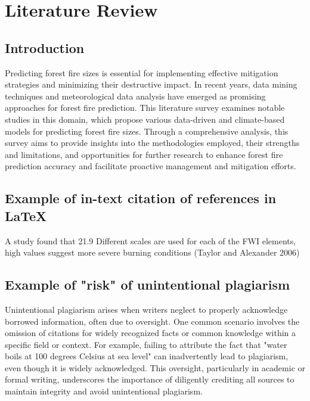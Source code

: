 \chapter{Literature Review}
\label{ch:lit_rev} %
\section{Introduction}
\label{sec:into_back}

Predicting forest fire sizes is essential for implementing effective mitigation strategies and minimizing their destructive impact. In recent years, data mining techniques and meteorological data analysis have emerged as promising approaches for forest fire prediction. This literature survey examines notable studies in this domain, which propose various data-driven and climate-based models for predicting forest fire sizes. Through a comprehensive analysis, this survey aims to provide insights into the methodologies employed, their strengths and limitations, and opportunities for further research to enhance forest fire prediction accuracy and facilitate proactive management and mitigation efforts.

\section{Example of in-text citation of references in LaTeX
}
\label{sec:into_back}
A study found that 21.9%
Different scales are used for each of the FWI elements, high values suggest more severe burning conditions (Taylor and Alexander 2006)

\section{Example of "risk" of unintentional plagiarism
}
\label{sec:into_back} 
Unintentional plagiarism arises when writers neglect to properly acknowledge borrowed information, often due to oversight. One common scenario involves the omission of citations for widely recognized facts or common knowledge within a specific field or context. 
For example, failing to attribute the fact that "water boils at 100 degrees Celsius at sea level" can inadvertently lead to plagiarism, even though it is widely acknowledged. This oversight, particularly in academic or formal writing, underscores the importance of diligently crediting all sources to maintain integrity and avoid unintentional plagiarism.

